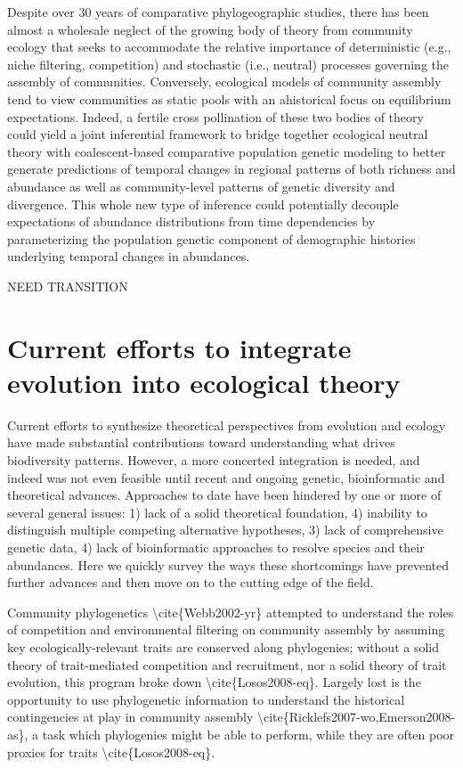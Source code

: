 \documentclass[]{article}
\begin{document}
Despite over 30 years of comparative phylogeographic studies, there has
been almost a wholesale neglect of the growing body of theory from
community ecology that seeks to accommodate the relative importance of
deterministic (e.g., niche filtering, competition) and stochastic (i.e.,
neutral) processes governing the assembly of communities. Conversely,
ecological models of community assembly tend to view communities as
static pools with an ahistorical focus on equilibrium expectations.
Indeed, a fertile cross pollination of these two bodies of theory could
yield a joint inferential framework to bridge together ecological
neutral theory with coalescent-based comparative population genetic
modeling to better generate predictions of temporal changes in regional
patterns of both richness and abundance as well as community-level
patterns of genetic diversity and divergence. This whole new type of
inference could potentially decouple expectations of abundance
distributions from time dependencies by parameterizing the population
genetic component of demographic histories underlying temporal changes
in abundances.

NEED TRANSITION

\section{Current efforts to integrate evolution into ecological
theory}\label{current-efforts-to-integrate-evolution-into-ecological-theory}

Current efforts to synthesize theoretical perspectives from evolution
and ecology have made substantial contributions toward understanding
what drives biodiversity patterns. However, a more concerted integration
is needed, and indeed was not even feasible until recent and ongoing
genetic, bioinformatic and theoretical advances. Approaches to date have
been hindered by one or more of several general issues: 1) lack of a
solid theoretical foundation, 4) inability to distinguish multiple
competing alternative hypotheses, 3) lack of comprehensive genetic data,
4) lack of bioinformatic approaches to resolve species and their
abundances. Here we quickly survey the ways these shortcomings have
prevented further advances and then move on to the cutting edge of the
field.

Community phylogenetics \textbackslash{}cite\{Webb2002-yr\} attempted to
understand the roles of competition and environmental filtering on
community assembly by assuming key ecologically-relevant traits are
conserved along phylogenies; without a solid theory of trait-mediated
competition and recruitment, nor a solid theory of trait evolution, this
program broke down \textbackslash{}cite\{Losos2008-eq\}. Largely lost is
the opportunity to use phylogenetic information to understand the
historical contingencies at play in community assembly
\textbackslash{}cite\{Ricklefs2007-wo,Emerson2008-as\}, a task which
phylogenies might be able to perform, while they are often poor proxies
for traits \textbackslash{}cite\{Losos2008-eq\}.
\end{document}
